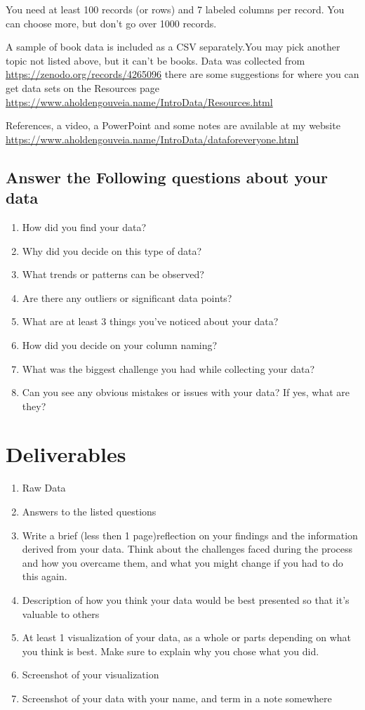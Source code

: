 \documentclass[12pt]{article}
\begin{document}
You need at least 100 records (or rows) and 7 labeled columns per record. You can choose more, but don't go over 1000 records.

A sample of book data is included as a CSV separately.You may pick another topic not listed above, but it can't be books. Data was collected from \url {https://zenodo.org/records/4265096} there are some suggestions for where you can get data sets on the Resources page \url{https://www.aholdengouveia.name/IntroData/Resources.html}



References, a video, a PowerPoint and some notes are available at my website \url {https://www.aholdengouveia.name/IntroData/dataforeveryone.html}

\subsection*{Answer the Following questions about your data}
    \begin{enumerate}
        \item How did you find your data?
        \item Why did you decide on this type of data?
        \item What trends or patterns can be observed?
        \item Are there any outliers or significant data points?
        \item What are at least 3 things you've noticed about your data? 
        \item How did you decide on your column naming?
        \item What was the biggest challenge you had while collecting your data?
        \item Can you see any obvious mistakes or issues with your data? If yes, what are they?
    \end{enumerate}



\section*{Deliverables}
\begin{enumerate}
    \item Raw Data
    \item Answers to the listed questions
    \item Write a brief (less then 1 page)reflection on your findings and the information derived from your data.  Think about the challenges faced during the process and how you overcame them, and what you might change if you had to do this again.
    \item Description of how you think your data would be best presented so that it's valuable to others
    \item At least 1 visualization of your data, as a whole or parts depending on what you think is best.  Make sure to explain why you chose what you did. 
    \item Screenshot of your visualization
    \item Screenshot of your data with your name, and term in a note somewhere
\end{enumerate}
\end{document}
